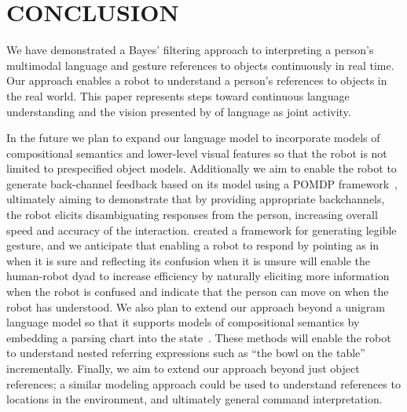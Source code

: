 \documentclass[letterpaper, 10 pt, conference]{ieeeconf}
\begin{document}
\section{CONCLUSION}

We have demonstrated a Bayes' filtering approach to interpreting a
person's multimodal language and gesture references to objects
continuously in real time.  Our approach enables a robot to understand
a person's references to objects in the real world.  This paper
represents steps toward continuous language understanding and the
vision presented by \citet{clark96} of language as joint activity.

In the future we plan to expand our language model to incorporate
models of compositional semantics and lower-level visual features so
that the robot is not limited to prespecified object models.
Additionally we aim to enable the robot to generate back-channel
feedback based on its model using a POMDP framework~\citep{kaelbling99}, ultimately aiming
to demonstrate that by providing appropriate backchannels, the robot
elicits disambiguating responses from the person, increasing overall
speed and accuracy of the interaction.  \citet{dragan13} created a
framework for generating legible gesture, and we anticipate that
enabling a robot to respond by pointing as in \citet{holladay14} when
it is sure and reflecting its confusion when it is unsure will enable
the human-robot dyad to increase efficiency by naturally eliciting
more information when the robot is confused and indicate that the
person can move on when the robot has understood.  We also plan to
extend our approach beyond a unigram language model so that it
supports models of compositional semantics by embedding a parsing
chart into the state~\citep{jurafsky95, earley70}.  These methods will
enable the robot to understand nested referring expressions such as
``the bowl on the table'' incrementally.  Finally, we aim to extend
our approach beyond just object references; a similar modeling
approach could be used to understand references to locations in the
environment, and ultimately general command interpretation. 



\end{document}
